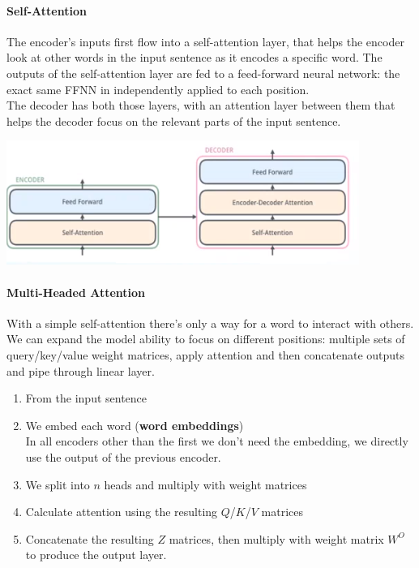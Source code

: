 \documentclass[10pt]{report}
\begin{document}
\paragraph{Self-Attention} The encoder's inputs first flow into a self-attention layer, that helps the encoder look at other words in the input sentence as it encodes a specific word. The outputs of the self-attention layer are fed to a feed-forward neural network: the exact same FFNN in independently applied to each position.\\
The decoder has both those layers, with an attention layer between them that helps the decoder focus on the relevant parts of the input sentence.
\begin{center}
	\includegraphics[scale=1]{72.png}
\end{center}
\paragraph{Multi-Headed Attention} With a simple self-attention there's only a way for a word to interact with others. We can expand the model ability to focus on different positions: multiple sets of query/key/value weight matrices, apply attention and then concatenate outputs and pipe through linear layer.
\begin{enumerate}
	\item From the input sentence
	\item We embed each word (\textbf{word embeddings})\\
	In all encoders other than the first we don't need the embedding, we directly use the output of the previous encoder.
	\item We split into $n$ heads and multiply with weight matrices
	\item Calculate attention using the resulting $Q$/$K$/$V$ matrices
	\item Concatenate the resulting $Z$ matrices, then multiply with weight matrix $W^O$ to produce the output layer.
\end{enumerate}
\end{document}
